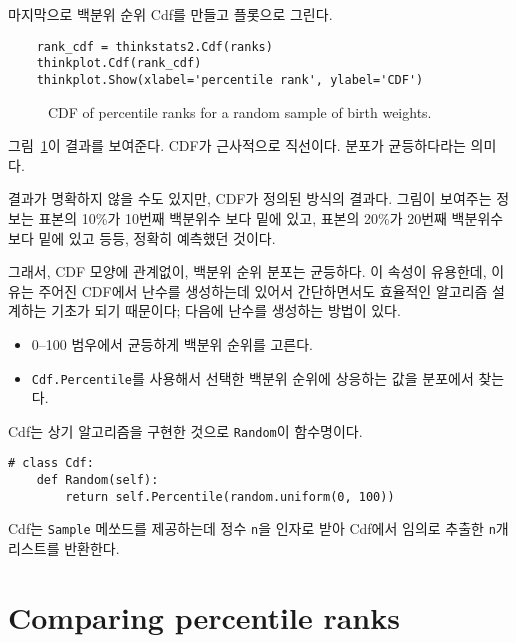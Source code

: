 마지막으로 백분위 순위 Cdf를 만들고 플롯으로 그린다.


\begin{verbatim}
    rank_cdf = thinkstats2.Cdf(ranks)
    thinkplot.Cdf(rank_cdf)
    thinkplot.Show(xlabel='percentile rank', ylabel='CDF')
\end{verbatim}

\begin{figure}
\caption{CDF of percentile ranks for a random sample of birth weights.}
\label{cumulative_random}
\end{figure}

그림~\ref{cumulative_random}이 결과를 보여준다.
CDF가 근사적으로 직선이다. 분포가 균등하다라는 의미다. 

결과가 명확하지 않을 수도 있지만, CDF가 정의된 방식의 결과다.
그림이 보여주는 정보는 표본의 10\%가 10번째 백분위수 보다 밑에 있고,
표본의 20\%가 20번째 백분위수 보다 밑에 있고 등등, 정확히 예측했던 것이다.

그래서, CDF 모양에 관계없이, 백분위 순위 분포는 균등하다. 
이 속성이 유용한데, 이유는 주어진 CDF에서 난수를 생성하는데 있어서 간단하면서도 효율적인 알고리즘 설계하는 기초가 되기 때문이다; 다음에 난수를 생성하는 방법이 있다.


\begin{itemize}

\item 0--100 범우에서 균등하게 백분위 순위를 고른다.

\item {\tt Cdf.Percentile}를 사용해서 선택한 백분위 순위에 상응하는 값을 분포에서 찾는다.

\end{itemize}

Cdf는 상기 알고리즘을 구현한 것으로 {\tt Random}이 함수명이다.

\begin{verbatim}
# class Cdf:
    def Random(self):
        return self.Percentile(random.uniform(0, 100))
\end{verbatim}

Cdf는 {\tt Sample} 메쏘드를 제공하는데 정수 {\tt n}을
인자로 받아 Cdf에서 임의로 추출한 {\tt n}개 리스트를 반환한다.


\section{Comparing percentile ranks}

